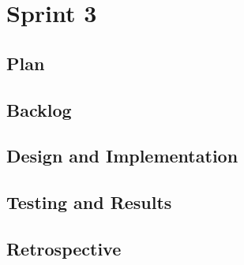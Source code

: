 \section{Sprint 3}
\subsection{Plan}
\subsection{Backlog}
\subsection{Design and Implementation}
\subsection{Testing and Results}
\subsection{Retrospective}
